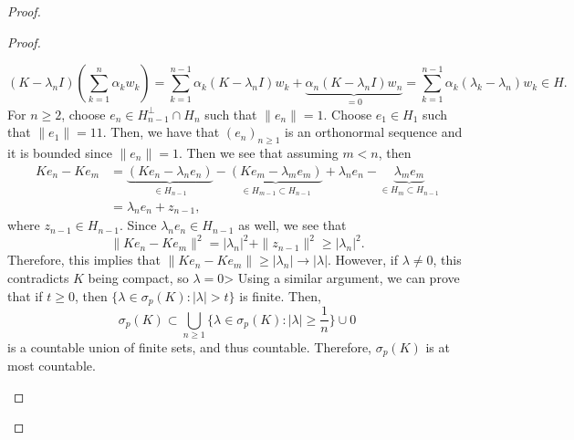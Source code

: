 \documentclass[oneside]{book}
\newcommand{\suml}{\sum\limits}
\newcommand{\sumkn}{\sum\limits_{k = 1}^{n}}
\newcommand{\sbs}{\subset}
\begin{document}
\begin{proof}
\begin{proof}
\begin{enumerate}
\[ (K - \lambda_n I) \left( \sumkn \alpha_k w_k \right) = \suml_{k = 1}^{n-1} \alpha_k (K - \lambda_n I) w_k + \underbrace{\alpha_n (K - \lambda_n I) w_n}_{= 0} = \suml_{k = 1}^{n-1} \alpha_k (\lambda_k - \lambda_n)  w_k  \in H. \]
For $n \geq 2$, choose $e_n \in H_{n-1}^{\perp} \cap H_n$ such that $\| e_n \| = 1$. Choose $e_1 \in H_1$ such that $\| e_1 \| = 11$. Then, we have that $(e_n)_{n \geq 1}$ is an orthonormal sequence and it is bounded since $\| e_n \| = 1$. Then we see that assuming $m < n$, then 
\begin{align*}
Ke_n - Ke_m & = \underbrace{(Ke_n - \lambda_n e_n)}_{\in H_{n-1}} -  \underbrace{(K e_m - \lambda_m e_m)}_{\in H_{m -1} \sbs H_{n - 1}} + \lambda_n e_n -  \underbrace{\lambda_m e_m}_{\in H_m \sbs H_{n -1}} \\
& = \lambda_n e_n + z_{n-1},
\end{align*}
where $z_{n - 1} \in H_{n - 1}$. Since $\lambda_n e_n \in H_{n -1}$ as well, we see that 
\[ \| K e_n - K e_m \|^2 = |\lambda_n|^2 + \| z_{n -1}\|^2 \geq |\lambda_n|^2.\]
Therefore, this implies that $\| K e_n - K e_m \| \geq |\lambda_n| \to | \lambda |$. However, if $\lambda \neq 0$, this contradicts $K$ being compact, so $\lambda = 0$> Using a similar argument, we can prove that if $t \geq 0$, then $\{ \lambda \in \sigma_p(K) : |\lambda| > t \}$ is finite. Then,
\[ \sigma_p(K) \sbs \bigcup_{n \geq 1} \{ \lambda \in \sigma_p(K) : |\lambda| \geq \frac{1}{n} \} \cup 0\]
is a countable union of finite sets, and thus countable. Therefore, $\sigma_p(K)$ is at most countable.
\end{enumerate}
\end{proof}

\end{proof}
\end{document}

